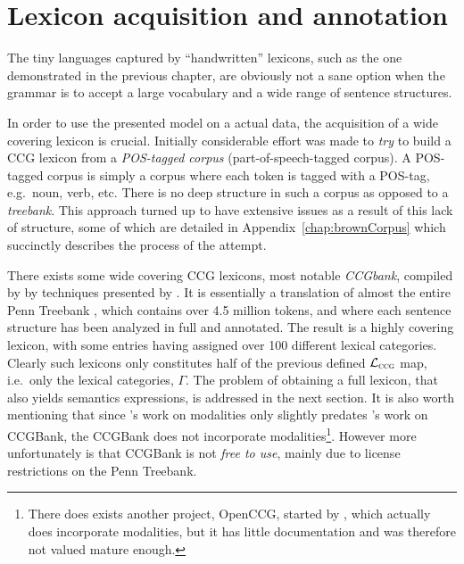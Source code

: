 
\chapter{Lexicon acquisition and annotation}
\label{chap:lexiconAcquisition}
The tiny languages captured by ``handwritten'' lexicons, such as the one demonstrated in the previous chapter, are obviously not a sane option when the grammar is to accept a large vocabulary and a wide range of sentence structures.

In order to use the presented model on a actual data, the acquisition of a wide covering lexicon is crucial. Initially considerable effort was made to \emph{try} to build a CCG lexicon from a \emph{POS-tagged corpus} (part-of-speech-tagged corpus). A POS-tagged corpus is simply a corpus where each token is tagged with a POS-tag, e.g.\ noun, verb, etc. There is no deep structure in such a corpus as opposed to a \emph{treebank}. This approach turned up to have extensive issues as a result of this lack of structure, some of which are detailed in Appendix~\ref{chap:brownCorpus} which succinctly describes the process of the attempt.

There exists some wide covering CCG lexicons, most notable \emph{CCGbank}, compiled by \citeauthor{ccgBank}  by techniques presented by \cite{juliaThesis}. It is essentially a translation of almost the entire Penn Treebank \cite{pennTreebank}, which contains over 4.5 million tokens, and where each sentence structure has been analyzed in full and annotated. The result is a highly covering lexicon, with some entries having assigned over 100 different lexical categories. Clearly such lexicons only constitutes half of the previous defined $\mathcal{L}_\textsc{ccg}$ map, i.e.\ only the lexical categories, $\Gamma$. The problem of obtaining a full lexicon, that also yields semantics expressions, is addressed in the next section. It is also worth mentioning that since \citeauthor{baldridgeThesis}'s  work on modalities only slightly predates \citeauthor{juliaThesis}'s  work on CCGBank, the CCGBank does not incorporate modalities\footnote{There does exists another project, OpenCCG, started by \citeauthor{baldridgeThesis}, which actually does incorporate modalities, but it has little documentation and was therefore not valued mature enough.}. However more unfortunately is that CCGBank is not \emph{free to use}, mainly due to license restrictions on the Penn Treebank.%

